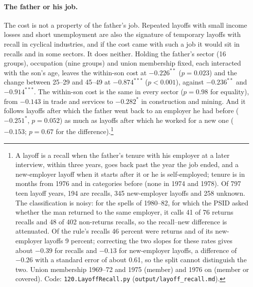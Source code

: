 \paragraph{The father or his job.} The cost is not a property of the father's job. Repeated layoffs with small income
losses and short unemployment are also the signature of temporary layoffs with recall in cyclical industries, and if
the cost came with such a job it would sit in recalls and in some sectors. It does neither. Holding the father's sector
(16 groups), occupation (nine groups) and union membership fixed, each interacted with the son's age, leaves the
within-son cost at $-0.226^{**}$ ($p = 0.023$) and the change between 25--29 and 45--49 at $-0.874^{***}$ ($p<0.001$),
against $-0.236^{**}$ and $-0.914^{***}$. The within-son cost is the same in every sector ($p = 0.98$ for equality),
from $-0.143$ in trade and services to $-0.282^{*}$ in construction and mining. And it follows layoffs after which the
father went back to an employer he had before ($-0.251^{*}$, $p = 0.052$) as much as layoffs after which he worked for a
new one ($-0.153$; $p = 0.67$ for the difference).\footnote{A layoff is a recall when the father's tenure with his
employer at a later interview, within three years, goes back past the year the job ended, and a new-employer layoff
when it starts after it or he is self-employed; tenure is in months from 1976 and in categories before (none in 1974
and 1978). Of 797 teen layoff years, 194 are recalls, 345 new-employer layoffs and 258 unknown. The classification is
noisy: for the spells of 1980--82, for which the PSID asked whether the man returned to the same employer, it calls 41
of 76 returns recalls and 48 of 402 non-returns recalls, so the recall--new difference is attenuated. Of the rule's
recalls 46 percent were returns and of its new-employer layoffs 9 percent; correcting the two slopes for these rates
gives about $-0.39$ for recalls and $-0.13$ for new-employer layoffs, a difference of $-0.26$ with a standard error of
about 0.61, so the split cannot distinguish the two. Union membership
1969--72 and 1975 (member) and 1976 on (member or covered). Code: \texttt{120.LayoffRecall.py}
(\texttt{output/layoff\_recall.md}).}

